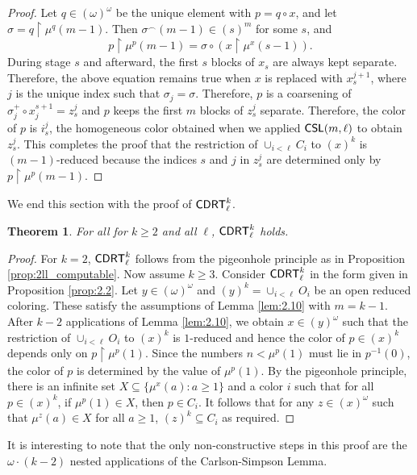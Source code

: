 \documentclass{amsart}
\newtheorem{thm}{Theorem}[section]
\theoremstyle{definition}
\theoremstyle{remark}
\newcommand{\system}[1]{\mbox{\fontfamily{cmss}\fontshape{n}\fontseries{m}%
    \selectfont#1}}
\newcommand{\CDRT}{\system{CDRT}}
\newcommand{\CSL}{\system{CSL}}
\newcommand{\restrict}{\upharpoonright}
\newcommand{\concat}{^\smallfrown}
\newcommand{\block}[2]{{#1}^{-1}(#2)}
\begin{document}
\begin{proof}
Let $q \in (\omega)^\omega$ be the unique element with
$p = q \circ x$, and let $\sigma = q \restrict \mu^q(m-1)$.
Then $ \sigma\concat (m-1) \in (s)^m$ for some $s$, and
$$p\restrict \mu^p(m-1) = \sigma \circ (x\restrict\mu^x(s-1)).$$
During stage $s$ and afterward, the first $s$ blocks of $x_s$ are 
always kept separate.  Therefore, the above equation remains true when $x$
is replaced with $x_s^{j+1}$, where $j$ is the unique index such 
that $\sigma_j = \sigma$.  Therefore, $p$ is a coarsening of 
$\sigma_j^+ \circ x_j^{s+1} = z_s^j$ and $p$ keeps the first $m$ 
blocks of $z_s^j$ separate.  
Therefore, the color of $p$ is $i_s^j$, the homogeneous color 
obtained when we applied $\CSL(m,\ell)$ to obtain $z_s^j$. 
This completes the proof that 
the restriction of $\cup_{i < \ell} C_i$ to $(x)^k$ is $(m-1)$-reduced because the indices $s$ and $j$ in $z_s^j$ are determined only by 
$p\restrict \mu^p(m-1)$.
\end{proof}

We end this section with the proof of $\CDRT^k_{\ell}$.
\begin{thm}\label{thm.3.31} For all for $k \geq 2$ and all $\ell$, $\CDRT^k_\ell$ holds.
\end{thm}
\begin{proof} For $k=2$, $\CDRT^k_{\ell}$ follows from the pigeonhole 
principle as in Proposition \ref{prop:2ll_computable}. 
Now assume $k\geq 3$.  
Consider $\CDRT^k_{\ell}$ in the form given in Proposition \ref{prop:2.2}. 
Let $y \in (\omega)^{\omega}$ 
and $(y)^k = \cup_{i < \ell} O_i$ be an open reduced coloring. These satisfy the assumptions of Lemma \ref{lem:2.10} with $m=k-1$.  After $k-2$ applications of 
Lemma \ref{lem:2.10}, we obtain $x \in (y)^{\omega}$ such that the restriction of $\cup_{i < \ell} O_i$ to $(x)^k$ is $1$-reduced and hence the color of $p \in (x)^k$ 
depends only on $p \upharpoonright \mu^p(1)$. Since the numbers $n < \mu^p(1)$ must lie in $\block{p}{0}$, the color of $p$ is determined by the value of 
$\mu^p(1)$. By the pigeonhole principle, there is an infinite set $X \subseteq \{ \mu^x(a) : a \geq 1 \}$ and a color $i$ such that for all $p \in (x)^k$, 
if $\mu^p(1) \in X$, then $p \in C_i$. It follows that for any $z \in (x)^{\omega}$ such that $\mu^z(a) \in X$ for all $a \geq 1$, 
$(z)^k \subseteq C_i$ as required. 
\end{proof}

It is interesting to note that the only non-constructive steps in this proof are the $\omega \cdot (k-2)$ nested applications of the 
Carlson-Simpson Lemma.  
\end{document}

